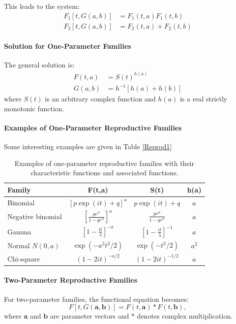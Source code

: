 This leads to the system:
\begin{align}
F_1[t, G(a, b)] &= F_1(t, a)F_1(t, b) \\
F_2[t, G(a, b)] &= F_2(t, a) + F_2(t, b)
\end{align}

\paragraph{Solution for One-Parameter Families}
The general solution is:
\begin{align}
F(t, a) &= S(t)^{h(a)} \\
G(a, b) &= h^{-1}[h(a) + h(b)]
\end{align}
where $S(t)$ is an arbitrary complex function and $h(a)$ is a real strictly monotonic function.

\paragraph{Examples of One-Parameter Reproductive Families}
Some interesting examples are given in Table \ref{Reprod1}
\begin{table}[H]
\centering
\begin{tabular}{|l|c|c|c|}
\hline
\textbf{Family} & \textbf{F(t,a)} & \textbf{S(t)} & \textbf{h(a)} \\
\hline
Binomial & $[p\exp(it) + q]^a$ & $p\exp(it) + q$ & $a$ \\
\hline
Negative binomial & $\left[\frac{pe^{it}}{1-qe^{it}}\right]^a$ & $\frac{pe^{it}}{1-qe^{it}}$ & $a$ \\
\hline
Gamma & $\left[1-\frac{it}{\lambda}\right]^{-a}$ & $\left[1-\frac{it}{\lambda}\right]^{-1}$ & $a$ \\
\hline
Normal $N(0,a)$ & $\exp(-a^2t^2/2)$ & $\exp(-t^2/2)$ & $a^2$ \\
\hline
Chi-square & $(1-2it)^{-a/2}$ & $(1-2it)^{-1/2}$ & $a$ \\
\hline
\end{tabular}
\caption{\label{Reprod1}Examples of one-parameter reproductive families with their characteristic functions and associated functions.}
\label{tab:reproductive_one}
\end{table}

\paragraph{Two-Parameter Reproductive Families}
For two-parameter families, the functional equation becomes:
\begin{equation}\label{Reprod2}
    F[t, G(\mathbf{a}, \mathbf{b})] = F(t, \mathbf{a}) \ast F(t, \mathbf{b}),
\end{equation}
where $\mathbf{a}$ and $\mathbf{b}$ are parameter vectors and $\ast$ denotes complex multiplication.

